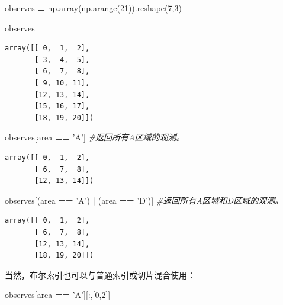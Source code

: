 \documentclass[]{article}
\newenvironment{Shaded}{\begin{snugshade}}{\end{snugshade}}
\newcommand{\DecValTok}[1]{\textcolor[rgb]{0.00,0.00,0.81}{#1}}
\newcommand{\StringTok}[1]{\textcolor[rgb]{0.31,0.60,0.02}{#1}}
\newcommand{\CommentTok}[1]{\textcolor[rgb]{0.56,0.35,0.01}{\textit{#1}}}
\newcommand{\OperatorTok}[1]{\textcolor[rgb]{0.81,0.36,0.00}{\textbf{#1}}}
\newcommand{\NormalTok}[1]{#1}
\begin{document}
\begin{Shaded}
\begin{Highlighting}[]
\NormalTok{observes }\OperatorTok{=}\NormalTok{ np.array(np.arange(}\DecValTok{21}\NormalTok{)).reshape(}\DecValTok{7}\NormalTok{,}\DecValTok{3}\NormalTok{)}
\end{Highlighting}
\end{Shaded}

\begin{Shaded}
\begin{Highlighting}[]
\NormalTok{observes}
\end{Highlighting}
\end{Shaded}

\begin{verbatim}
array([[ 0,  1,  2],
       [ 3,  4,  5],
       [ 6,  7,  8],
       [ 9, 10, 11],
       [12, 13, 14],
       [15, 16, 17],
       [18, 19, 20]])
\end{verbatim}

\begin{Shaded}
\begin{Highlighting}[]
\NormalTok{observes[area }\OperatorTok{==} \StringTok{'A'}\NormalTok{] }\CommentTok{#返回所有A区域的观测。}
\end{Highlighting}
\end{Shaded}

\begin{verbatim}
array([[ 0,  1,  2],
       [ 6,  7,  8],
       [12, 13, 14]])
\end{verbatim}

\begin{Shaded}
\begin{Highlighting}[]
\NormalTok{observes[(area }\OperatorTok{==} \StringTok{'A'}\NormalTok{) }\OperatorTok{|}\NormalTok{ (area }\OperatorTok{==} \StringTok{'D'}\NormalTok{)] }\CommentTok{#返回所有A区域和D区域的观测。}
\end{Highlighting}
\end{Shaded}

\begin{verbatim}
array([[ 0,  1,  2],
       [ 6,  7,  8],
       [12, 13, 14],
       [18, 19, 20]])
\end{verbatim}

当然，布尔索引也可以与普通索引或切片混合使用：

\begin{Shaded}
\begin{Highlighting}[]
\NormalTok{observes[area }\OperatorTok{==} \StringTok{'A'}\NormalTok{][:,[}\DecValTok{0}\NormalTok{,}\DecValTok{2}\NormalTok{]]}
\end{Highlighting}
\end{Shaded}
\end{document}
